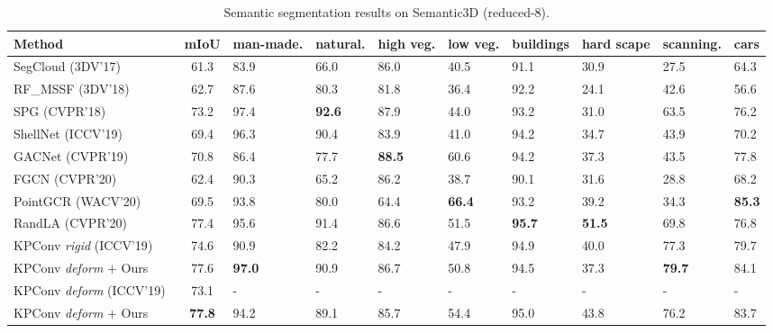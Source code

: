 \documentclass[final]{cvpr}
\begin{document}
\renewcommand{\arraystretch}{0.9}
\begin{table*}[!h]
\setlength\tabcolsep{0.5pt}
\begin{footnotesize}
\begin{center}
\begin{tabular}{L{4.2cm} | C{1.cm} | *{8}{C{1.5cm}}}
\toprule
Method	 & mIoU & man-made.	 & natural.	 & high veg. & low veg.	 & buildings	 & hard scape & scanning. & cars	\Bstrut\\
\midrule
SegCloud ({\color{blue}3DV'17})~\cite{tchapmi2017segcloud} & 61.3 & 83.9 & 66.0 & 86.0 & 40.5 & 91.1 & 30.9 & 27.5 & 64.3\\
RF\_MSSF ({\color{blue}3DV'18})~\cite{thomas2018semantic} & 62.7& 87.6 & 80.3 & 81.8 & 36.4 & 92.2 & 24.1 & 42.6 & 56.6\\
SPG ({\color{blue}CVPR'18})~\cite{landrieu2018large} & 73.2& 97.4& \textbf{92.6} & 87.9& 44.0 & 93.2 & 31.0 & 63.5 & 76.2\\
ShellNet ({\color{blue}ICCV'19})~\cite{zhang2019shellnet} & 69.4 & 96.3 & 90.4 & 83.9 & 41.0 & 94.2 & 34.7 & 43.9 & 70.2\\
GACNet ({\color{blue}CVPR'19})~\cite{wang2019graph} & 70.8& 86.4 & 77.7 & \textbf{88.5} & 60.6 & 94.2 & 37.3 & 43.5 & 77.8\\
FGCN ({\color{blue}CVPR'20})~\cite{khan2020fgcn} & 62.4& 90.3 & 65.2 & 86.2 & 38.7 & 90.1 & 31.6 & 28.8 & 68.2\\
PointGCR ({\color{blue}WACV'20})~\cite{ma2020global} & 69.5& 93.8 & 80.0 & 64.4 & \textbf{66.4} & 93.2 & 39.2 & 34.3 & \textbf{85.3}\\
RandLA ({\color{blue}CVPR'20})~\cite{hu2020randla} & 77.4& 95.6 & 91.4 & 86.6 & 51.5 & \textbf{95.7} & \textbf{51.5} & 69.8 & 76.8\\
\midrule
KPConv \textit{rigid} ({\color{blue}ICCV'19})~\cite{thomas2019kpconv}	& 74.6	&  90.9 & 82.2 & 84.2 & 47.9 & 94.9 & 40.0 & 77.3 & 79.7\\
KPConv \textit{deform} + Ours & 77.6 & \textbf{97.0} & 90.9 & 86.7	& 50.8	& 94.5	& 37.3	& \textbf{79.7}	& 84.1\Bstrut\\
\midrule
KPConv \textit{deform} ({\color{blue}ICCV'19})~\cite{thomas2019kpconv}	& 73.1	&  - & - & - & - & - & - & - & -\\
KPConv \textit{deform} + Ours & \textbf{77.8} & 94.2 & 89.1 & 85.7 & 54.4 & 95.0 & 43.8 & 76.2 & 83.7 \Bstrut\\
\bottomrule
\end{tabular}
\end{center}
\end{footnotesize}
\caption{Semantic segmentation results on Semantic3D (reduced-8).}
\label{tab:semantic3d_supp} 
\end{table*}
\end{document}

